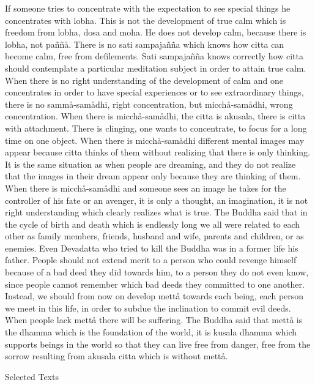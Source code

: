 \documentclass[12pt,twoside]{article}
\begin{document}
If someone tries to concentrate with the expectation to see special
things he concentrates with lobha. This is not the development of true
calm which is freedom from lobha, dosa and moha. He does not develop
calm, because there is lobha, not pa\~n\~n{\aa}. There is no sati
sampaja\~n\~na which knows how citta can become calm, free from
defilements. Sati sampaja\~n\~na knows correctly how citta should
contemplate a particular meditation subject in order to attain true
calm. When there is no right understanding of the development of calm
and one concentrates in order to have special experiences or to see
extraordinary things, there is no samm{\aa}{}-sam{\aa}dhi, right
concentration, but micch{\aa}{}-sam{\aa}dhi, wrong concentration. When
there is micch{\aa}{}-sam{\aa}dhi, the citta is akusala, there is citta
with attachment. There is clinging, one wants to concentrate, to focus
for a long time on one object. When there is micch{\aa}{}-sam{\aa}dhi
different mental images may appear because citta thinks of them without
realizing that there is only thinking. It is the same situation as when
people are dreaming, and they do not realize that the images in their
dream appear only because they are thinking of them. When there is
micch{\aa}{}-sam{\aa}dhi and someone sees an image he takes for the
controller of his fate or an avenger, it is only a thought, an
imagination, it is not right understanding which clearly realizes what
is true. The Buddha said that in the cycle of birth and death which is
endlessly long we all were related to each other as family members,
friends, husband and wife, parents and children, or as enemies. Even
Devadatta who tried to kill the Buddha was in a former life his father.
People should not extend merit to a person who could revenge himself
because of a bad deed they did towards him, to a person they do not
even know, since people cannot remember which bad deeds they committed
to one another. Instead, we should from now on develop mett{\aa}
towards each being, each person we meet in this life, in order to
subdue the inclination to commit evil deeds. When people lack mett{\aa}
there will be suffering. The Buddha said that mett{\aa} is the dhamma
which is the foundation of the world, it is kusala dhamma which
supports beings in the world so that they can live free from danger,
free from the sorrow resulting from akusala citta which is without
mett{\aa}.


\bigskip


\bigskip

\clearpage
Selected Texts
\end{document}

